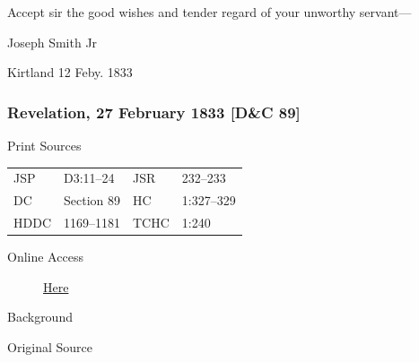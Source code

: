 				\begin{tightright}
				Accept sir the good wishes and tender regard of your unworthy servant---
				
				Joseph Smith Jr
				\end{tightright}
				
				Kirtland 12 Feby. 1833
				
		\subsubsection{Revelation, 27 February 1833 [D\&C 89]}
			\label{EMS-1833-JS-27-FEB-1833}
		
			\begin{description}
				\item[Print Sources]
			\end{description}

				\begin{tabular}{p{0.5in}p{1in}p{0.5in}p{1in}}
				JSP	 	& D3:11--24			& JSR 		& 232--233 \\
				DC	 	& Section 89 		& HC 		& 1:327--329 \\
				HDDC 	& 1169--1181		& TCHC 		& 1:240 \\
				\end{tabular}
			
			\begin{description}
				\item[Online Access] \href{https://www.josephsmithpapers.org/paper-summary/revelation-27-february-1833-dc-89/1}{Here}
			\end{description}
			
			\begin{description}
				\item[Background]
			\end{description}
			
			
			\begin{description}
				\item[Original Source]
			\end{description}
			

